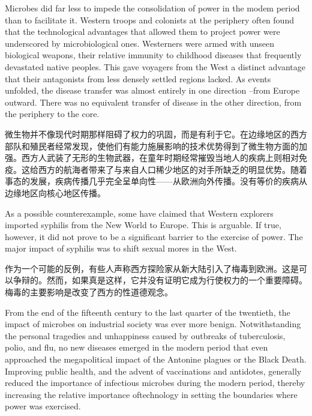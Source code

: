 \begin{Parallel}{97mm}{45mm}
  \ParallelLText
  {Microbes did far less to impede the consolidation of power in the modem period than to facilitate it. Western troops and colonists at the periphery often found that the technological advantages that allowed them to project power were underscored by microbiological ones. Westerners were armed with unseen biological weapons, their relative immunity to childhood diseases that frequently devastated native peoples. This gave voyagers from the West a distinct advantage that their antagonists from less densely settled regions lacked. As events unfolded, the disease transfer was almost entirely in one direction --from Europe outward. There was no equivalent transfer of disease in the other direction, from the periphery to the core.}
  
  \ParallelRText
  {微生物并不像现代时期那样阻碍了权力的巩固，而是有利于它。在边缘地区的西方部队和殖民者经常发现，使他们有能力施展影响的技术优势得到了微生物方面的加强。西方人武装了无形的生物武器，在童年时期经常摧毁当地人的疾病上则相对免疫。这给西方的航海者带来了与来自人口稀少地区的对手所缺乏的明显优势。随着事态的发展，疾病传播几乎完全呈单向性——从欧洲向外传播。没有等价的疾病从边缘地区向核心地区传播。}
  \ParallelPar



  \ParallelLText
  {As a possible counterexample, some have claimed that Western explorers imported syphilis from the New World to Europe. This is arguable. If true, however, it did not prove to be a significant barrier to the exercise of power. The major impact of syphilis was to shift sexual mores in the West.}
  
  \ParallelRText
  {作为一个可能的反例，有些人声称西方探险家从新大陆引入了梅毒到欧洲。这是可以争辩的。然而，如果真是这样，它并没有证明它成为行使权力的一个重要障碍。梅毒的主要影响是改变了西方的性道德观念。}
  \ParallelPar


  \ParallelLText
  {From the end of the fifteenth century to the last quarter of the twentieth, the impact of microbes on industrial society was ever more benign. Notwithstanding the personal tragedies and unhappiness caused by outbreaks of tuberculosis, polio, and flu, no new diseases emerged in the modern period that even approached the megapolitical impact of the Antonine plagues or the Black Death. Improving public health, and the advent of vaccinations and antidotes, generally reduced the importance of infectious microbes during the modern period, thereby increasing the relative importance oftechnology in setting the boundaries where power was exercised.}
  

\end{Parallel}
